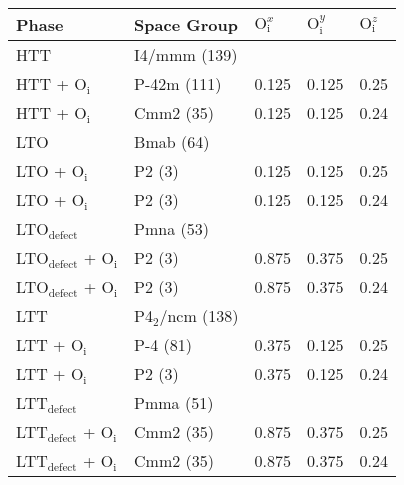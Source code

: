 \begin{tabular}{@{}lllll@{}}
\toprule
Phase                   & Space Group & $\text{O}_\text{i}^x$ & $\text{O}_\text{i}^y$ & $\text{O}_\text{i}^z$ \\ \midrule
HTT                     & I4/mmm (139)      &         &         &         \\
HTT + O$_\text{i}$      & P-42m  (111)    & 0.125   & 0.125   & 0.25    \\
HTT + O$_\text{i}$      & Cmm2 (35)       & 0.125   & 0.125   & 0.24    \\
LTO                     & Bmab (64)       &         &         &         \\
LTO + O$_\text{i}$      & P2 (3)    & 0.125   & 0.125   & 0.25    \\
LTO + O$_\text{i}$      & P2 (3)         & 0.125   & 0.125   & 0.24    \\
LTO$_\text{defect}$     & Pmna (53)       &         &         &         \\
LTO$_\text{defect}$ + O$_\text{i}$ & P2 (3)         & 0.875   & 0.375   & 0.25    \\
LTO$_\text{defect}$ + O$_\text{i}$ & P2 (3)         & 0.875   & 0.375   & 0.24    \\
LTT                     & P4$_2$/ncm (138)  &         &         &         \\
LTT + O$_\text{i}$      & P-4 (81)        & 0.375   & 0.125   & 0.25    \\
LTT + O$_\text{i}$      & P2 (3)         & 0.375   & 0.125   & 0.24    \\
LTT$_\text{defect}$               & Pmma (51)       &         &         &         \\
LTT$_\text{defect}$ + O$_\text{i}$ & Cmm2 (35)       & 0.875   & 0.375   & 0.25    \\
LTT$_\text{defect}$ + O$_\text{i}$ & Cmm2 (35)       & 0.875   & 0.375   & 0.24    \\ \bottomrule
\end{tabular}
